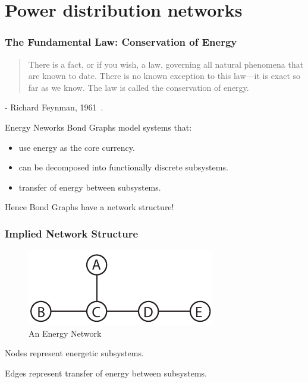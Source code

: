 \documentclass[11pt,reqno]{beamer}
\begin{document}
\section{Power distribution networks}
\begin{frame}
\frametitle{The Fundamental Law: Conservation of Energy}
\begin{quotation}
	There is a fact, or if you wish, a law, governing all natural phenomena that are known to date. There is no known exception to this law—it is exact so far as we know. The law is called the conservation of energy.
\end{quotation}

- Richard Feynman, 1961~\cite{Feynman1961}.
\end{frame}
\begin{frame}{Energy Neworks}
Bond Graphs model systems that:
\begin{itemize}
	\item use energy as the core currency.
	\item can be decomposed into functionally discrete subsystems.
	\item transfer of energy between subsystems.
\end{itemize}
\vspace{1cm}
Hence Bond Graphs have a network structure!
\end{frame}
\begin{frame}
\frametitle{Implied Network Structure}
\begin{figure}
	\centering
	\includegraphics{network_1.pdf}
	\caption{An Energy Network}
\end{figure}
Nodes represent energetic subsystems.

\vspace{5pt}

Edges represent transfer of energy between subsystems.
\end{frame}
\end{document}
